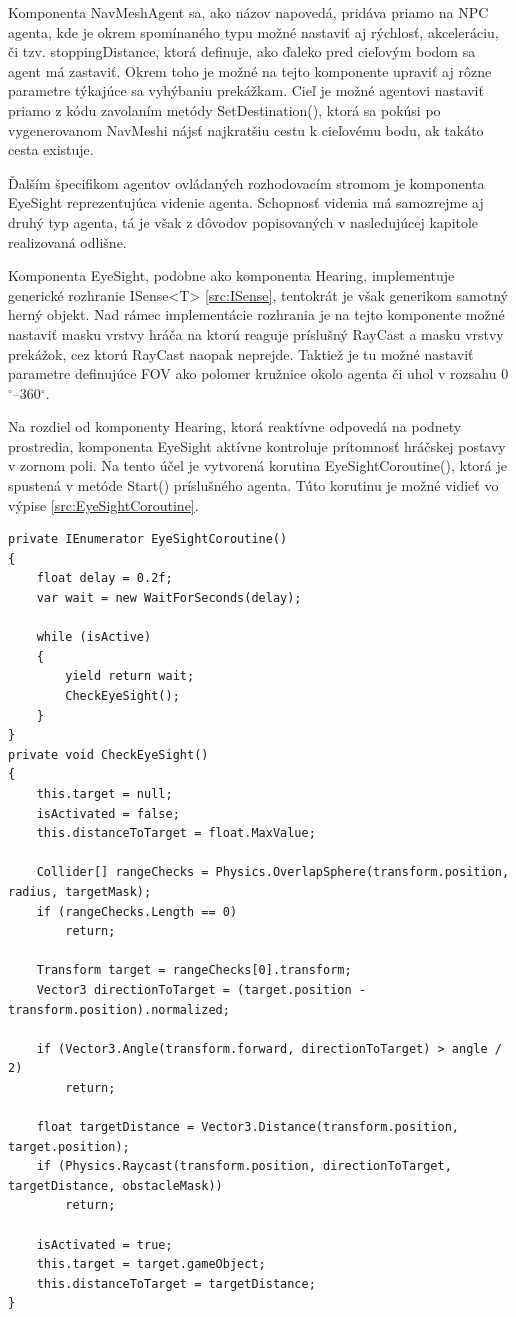 \documentclass[slovak, master]{diploma}
\begin{document}
Komponenta NavMeshAgent sa, ako názov napovedá, pridáva priamo na NPC agenta, kde je okrem spomínaného typu možné nastaviť aj rýchlosť, akceleráciu, či tzv. stoppingDistance, ktorá definuje, ako ďaleko pred cieľovým bodom sa agent má zastaviť. Okrem toho je možné na tejto komponente upraviť aj rôzne parametre týkajúce sa vyhýbaniu prekážkam. Cieľ je možné agentovi nastaviť priamo z kódu zavolaním metódy SetDestination(), ktorá sa pokúsi po vygenerovanom NavMeshi nájsť najkratšiu cestu k cieľovému bodu, ak takáto cesta existuje.

Ďalším špecifikom agentov ovládaných rozhodovacím stromom je komponenta EyeSight reprezentujúca videnie agenta. Schopnosť videnia má samozrejme aj druhý typ agenta, tá je však z dôvodov popisovaných v nasledujúcej kapitole realizovaná odlišne.

Komponenta EyeSight, podobne ako komponenta Hearing, implementuje generické rozhranie ISense<T> \ref{src:ISense}, tentokrát je však generikom samotný herný objekt. Nad rámec implementácie rozhrania je na tejto komponente možné nastaviť masku vrstvy hráča na ktorú reaguje príslušný RayCast a masku vrstvy prekážok, cez ktorú RayCast naopak neprejde. Taktiež je tu možné nastaviť parametre definujúce FOV ako polomer kružnice okolo agenta či uhol v rozsahu 0$^{\circ}$--360$^{\circ}$.

Na rozdiel od komponenty Hearing, ktorá reaktívne odpovedá na podnety prostredia, komponenta EyeSight aktívne kontroluje prítomnosť hráčskej postavy v zornom poli. Na tento účel je vytvorená korutina EyeSightCoroutine(), ktorá je spustená v metóde Start() príslušného agenta. Túto korutinu je možné vidieť vo výpise \ref{src:EyeSightCoroutine}.

\vspace{8pt}
\begin{lstlisting}[label=src:EyeSightCoroutine,caption={Korutina zabezpečujúca videnie agenta}]
private IEnumerator EyeSightCoroutine()
{
    float delay = 0.2f;
    var wait = new WaitForSeconds(delay);

    while (isActive)
    {
        yield return wait;
        CheckEyeSight();
    }
}
private void CheckEyeSight()
{
    this.target = null;
    isActivated = false;
    this.distanceToTarget = float.MaxValue;

    Collider[] rangeChecks = Physics.OverlapSphere(transform.position, radius, targetMask);
    if (rangeChecks.Length == 0)
        return;

    Transform target = rangeChecks[0].transform;
    Vector3 directionToTarget = (target.position - transform.position).normalized;

    if (Vector3.Angle(transform.forward, directionToTarget) > angle / 2)
        return;

    float targetDistance = Vector3.Distance(transform.position, target.position);
    if (Physics.Raycast(transform.position, directionToTarget, targetDistance, obstacleMask))
        return;

    isActivated = true;
    this.target = target.gameObject;
    this.distanceToTarget = targetDistance;
}
\end{lstlisting}
\end{document}
